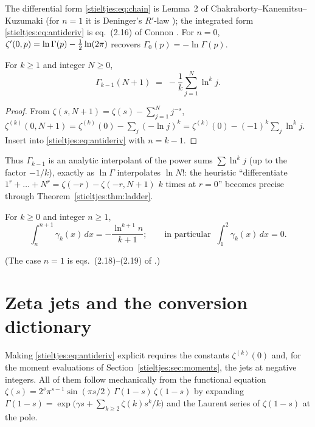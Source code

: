 The differential form \eqref{stieltjes:eq:chain} is Lemma~2 of
Chakraborty--Kanemitsu--Kuzumaki \cite{stieltjes:CKK} (for $n=1$ it is Deninger's
$R'$-law \cite{bridge:Deninger}); the integrated form \eqref{stieltjes:eq:antideriv} is
eq.~(2.16) of Connon \cite{stieltjes:Connon}. For $n=0$,
$\zeta'(0,p)=\ln\Gamma(p)-\tfrac12\ln(2\pi)$ recovers
$\Gamma_{\!0}(p)=-\ln\Gamma(p)$.

\begin{theorem}\label{stieltjes:thm:interp}
For $k\ge1$ and integer $N\ge0$,
\[
\Gamma_{\!k-1}(N+1)\;=\;-\frac1k\sum_{j=1}^{N}\ln^k j .
\]
\end{theorem}

\begin{proof}
From $\zeta(s,N+1)=\zeta(s)-\sum_{j=1}^N j^{-s}$,
$\zeta^{(k)}(0,N+1)=\zeta^{(k)}(0)-\sum_j(-\ln j)^k
=\zeta^{(k)}(0)-(-1)^k\sum_j\ln^k j$. Insert into \eqref{stieltjes:eq:antideriv} with
$n=k-1$.
\end{proof}

Thus $\Gamma_{\!k-1}$ is an analytic interpolant of the power sums
$\sum\ln^k j$ (up to the factor $-1/k$), exactly as $\ln\Gamma$ interpolates
$\ln N!$: the heuristic ``differentiate $1^r+\dots+N^r=\zeta(-r)-\zeta(-r,N+1)$
$k$ times at $r=0$'' becomes precise through
Theorem~\ref{stieltjes:thm:ladder}.

\begin{corollary}\label{stieltjes:cor:translates}
For $k\ge0$ and integer $n\ge1$,
\[
\int_n^{n+1}\gamma_k(x)\,dx=-\frac{\ln^{k+1}n}{k+1};
\qquad\text{in particular }\ \int_1^2\gamma_k(x)\,dx=0 .
\]
\end{corollary}

\noindent
(The case $n=1$ is eqs.~(2.18)--(2.19) of \cite{stieltjes:Connon}.)

\section{Zeta jets and the conversion dictionary}\label{stieltjes:sec:jets}

Making \eqref{stieltjes:eq:antideriv} explicit requires the constants
$\zeta^{(k)}(0)$ and, for the moment evaluations of
Section~\ref{stieltjes:sec:moments}, the jets at negative integers. All of them follow
mechanically from the functional equation
$\zeta(s)=2^s\pi^{s-1}\sin(\pi s/2)\,\Gamma(1-s)\,\zeta(1-s)$
by expanding $\Gamma(1-s)=\exp\bigl(\gamma s+\sum_{k\ge2}\zeta(k)s^k/k\bigr)$
and the Laurent series of $\zeta(1-s)$ at the pole.

